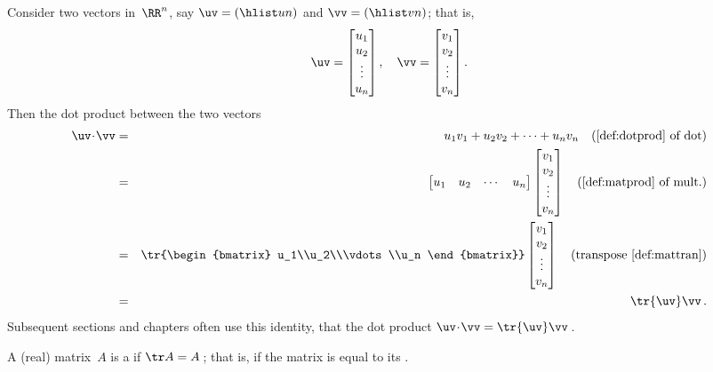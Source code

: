 \begin{example} \label{eg:trdp}
Consider two vectors in~\(\RR^n\), say \(\uv=(\hlist un)\) and \(\vv=(\hlist vn)\); that is,
\begin{equation*}
\uv=\begin{bmatrix} u_1\\u_2\\\vdots\\u_n \end{bmatrix},\quad
\vv=\begin{bmatrix} v_1\\v_2\\\vdots\\v_n \end{bmatrix}.
\end{equation*}
Then the dot product between the two vectors
\begin{eqnarray*}
\uv\cdot\vv&=&u_1v_1+u_2v_2+\cdots+u_nv_n \quad(\text{\autoref{def:dotprod} of dot})
\\&=&\begin{bmatrix} u_1&u_2&\cdots&u_n \end{bmatrix}
\begin{bmatrix} v_1\\v_2\\\vdots\\v_n \end{bmatrix}\quad(\text{\autoref{def:matprod} of mult.})
\\&=&\tr{\begin{bmatrix} u_1\\u_2\\\vdots\\u_n \end{bmatrix}}
\begin{bmatrix} v_1\\v_2\\\vdots\\v_n \end{bmatrix}\quad(\text{transpose \autoref{def:mattran}})
\\&=&\tr{\uv}\vv\,.
\end{eqnarray*}
Subsequent sections and chapters often use this identity, that the dot product \(\uv\cdot\vv=\tr{\uv}\vv\)\,.
\end{example}


\begin{definition}[symmetry] \label{def:matsym}
A (real) matrix~\(A\) is a  if \(\tr A=A\)\,; that is, if the matrix is equal to its .
\end{definition}

